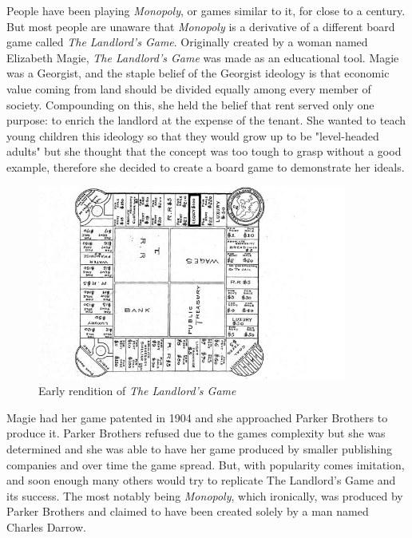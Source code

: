 \documentclass{article}
\begin{document}
People have been playing \textit{Monopoly}, or games similar to it, for close to a century.  But most people are unaware that \textit{Monopoly} is a derivative of a different board game called \textit{The Landlord’s Game}.  Originally created by a woman named Elizabeth Magie, \textit{The Landlord’s Game} was made as an educational tool.  Magie was a Georgist, and the staple belief of the Georgist ideology is that economic value coming from land should be divided equally among every member of society.  Compounding on this, she held the belief that rent served only one purpose: to enrich the landlord at the expense of the tenant.  She wanted to teach young children this ideology so that they would grow up to be "level-headed adults" but she thought that the concept was too tough to grasp without a good example, therefore she decided to create a board game to demonstrate her ideals. 


\begin{figure}
    \centering
    \includegraphics[width=4.0in]{landlordsgame}
    \caption{Early rendition of \textit{The Landlord's Game}}
    \label{landlordsgame_image}
\end{figure}


Magie had her game patented in 1904 and she approached Parker Brothers to produce it.  Parker Brothers refused due to the games complexity but she was determined and she was able to have her game produced by smaller publishing companies and over time the game spread. But, with popularity comes imitation, and soon enough many others would try to replicate The Landlord’s Game and its success.  The most notably being \textit{Monopoly}, which ironically, was produced by Parker Brothers and claimed to have been created solely by a man named Charles Darrow.
\end{document}
